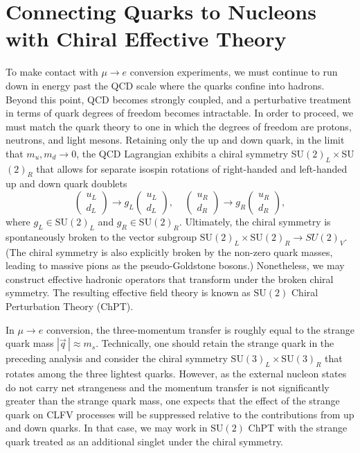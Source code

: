 \documentclass[12pt,letterpaper]{book}
\begin{document}
\section{Connecting Quarks to Nucleons with Chiral Effective Theory}
\label{sec:quarks_2_nucleons}
To make contact with $\mu\rightarrow e$ conversion experiments, we must continue to run down in energy past the QCD scale where the quarks confine into hadrons. Beyond this point, QCD becomes strongly coupled, and a perturbative treatment in terms of quark degrees of freedom becomes intractable. In order to proceed, we must match the quark theory to one in which the degrees of freedom are protons, neutrons, and light mesons. Retaining only the up and down quark, in the limit that $m_u,m_d\rightarrow 0$, the QCD Lagrangian exhibits a chiral symmetry SU$(2)_L\times$SU$(2)_R$ that allows for separate isospin rotations of right-handed and left-handed up and down quark doublets
\begin{equation}
\left(\begin{array}{c}
u_L\\
d_L
\end{array}\right)\rightarrow g_L\left(\begin{array}{c}
u_L\\
d_L
\end{array}\right),\;\;\;\;\left(\begin{array}{c}
u_R\\
d_R
\end{array}\right)\rightarrow g_R\left(\begin{array}{c}
u_R\\
d_R
\end{array}\right),
\end{equation}
where $g_L\in\mathrm{SU}(2)_L$ and $g_R\in\mathrm{SU}(2)_R$. Ultimately, the chiral symmetry is spontaneously broken to the vector subgroup $\mathrm{SU}(2)_L\times\mathrm{SU}(2)_R\rightarrow SU(2)_V$. (The chiral symmetry is also explicitly broken by the non-zero quark masses, leading to massive pions as the pseudo-Goldstone bosons.) Nonetheless, we may construct effective hadronic operators that transform under the broken chiral symmetry. The resulting effective field theory is known as $\mathrm{SU}(2)$ Chiral Perturbation Theory (ChPT).

In $\mu\rightarrow e$ conversion, the three-momentum transfer is roughly equal to the strange quark mass $|\vec{q}\,|\approx m_s$. Technically, one should retain the strange quark in the preceding analysis and consider the  chiral symmetry $\mathrm{SU}(3)_L\times\mathrm{SU}(3)_R$ that rotates among the three lightest quarks. However, as the external nucleon states do not carry net strangeness and the momentum transfer is not significantly greater than the strange quark mass, one expects that the effect of the strange quark on CLFV processes will be suppressed relative to the contributions from up and down quarks. In that case, we may work in $\mathrm{SU}(2)$ ChPT with the strange quark treated as an additional singlet under the chiral symmetry.
\end{document}
